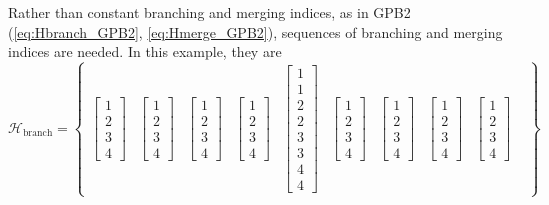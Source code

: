 {Rather than constant branching and merging indices, as in GPB2 (\ref{eq:Hbranch_GPB2}, \ref{eq:Hmerge_GPB2}), sequences of branching and merging indices are needed. In this example, they are
\begin{equation} \label{eq:Hbranch_SFex2}
	\mathcal{H}_{\text{branch}} = \begin{Bmatrix}
		\begin{bmatrix} 1 \\ 2 \\ 3 \\ 4 \end{bmatrix} &
		\begin{bmatrix} 1 \\ 2 \\ 3 \\ 4 \end{bmatrix} &
		\begin{bmatrix} 1 \\ 2 \\ 3 \\ 4 \end{bmatrix} &
		\begin{bmatrix} 1 \\ 2 \\ 3 \\ 4 \end{bmatrix} &
		\begin{bmatrix} 1 \\ 1 \\ 2 \\ 2 \\ 3 \\ 3 \\ 4 \\ 4 \end{bmatrix} &
		\begin{bmatrix} 1 \\ 2 \\ 3 \\ 4 \end{bmatrix} &
		\begin{bmatrix} 1 \\ 2 \\ 3 \\ 4 \end{bmatrix} &
		\begin{bmatrix} 1 \\ 2 \\ 3 \\ 4 \end{bmatrix} &
		\begin{bmatrix} 1 \\ 2 \\ 3 \\ 4 \end{bmatrix} &

\end{Bmatrix}
\end{equation}}
